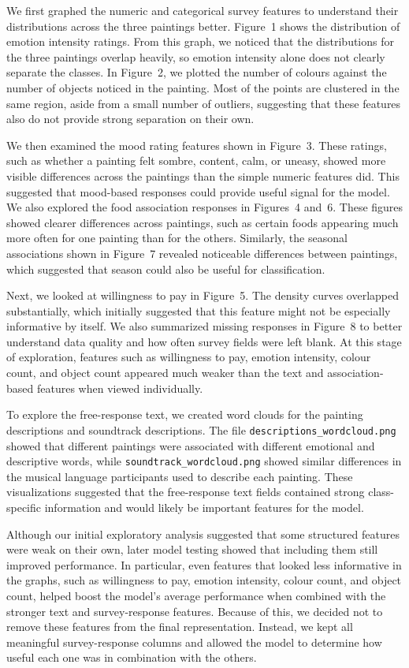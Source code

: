 \documentclass[12pt]{article}
\begin{document}
We first graphed the numeric and categorical survey features to understand their distributions across the three paintings better. Figure~1 shows the distribution of emotion intensity ratings. From this graph, we noticed that the distributions for the three paintings overlap heavily, so emotion intensity alone does not clearly separate the classes. In Figure~2, we plotted the number of colours against the number of objects noticed in the painting. Most of the points are clustered in the same region, aside from a small number of outliers, suggesting that these features also do not provide strong separation on their own.

We then examined the mood rating features shown in Figure~3. These ratings, such as whether a painting felt sombre, content, calm, or uneasy, showed more visible differences across the paintings than the simple numeric features did. This suggested that mood-based responses could provide useful signal for the model. We also explored the food association responses in Figures~4 and~6. These figures showed clearer differences across paintings, such as certain foods appearing much more often for one painting than for the others. Similarly, the seasonal associations shown in Figure~7 revealed noticeable differences between paintings, which suggested that season could also be useful for classification.

Next, we looked at willingness to pay in Figure~5. The density curves overlapped substantially, which initially suggested that this feature might not be especially informative by itself. We also summarized missing responses in Figure~8 to better understand data quality and how often survey fields were left blank. At this stage of exploration, features such as willingness to pay, emotion intensity, colour count, and object count appeared much weaker than the text and association-based features when viewed individually.

To explore the free-response text, we created word clouds for the painting descriptions and soundtrack descriptions. The file \texttt{descriptions\_wordcloud.png} showed that different paintings were associated with different emotional and descriptive words, while \texttt{soundtrack\_wordcloud.png} showed similar differences in the musical language participants used to describe each painting. These visualizations suggested that the free-response text fields contained strong class-specific information and would likely be important features for the model.

Although our initial exploratory analysis suggested that some structured features were weak on their own, later model testing showed that including them still improved performance. In particular, even features that looked less informative in the graphs, such as willingness to pay, emotion intensity, colour count, and object count, helped boost the model's average performance when combined with the stronger text and survey-response features. Because of this, we decided not to remove these features from the final representation. Instead, we kept all meaningful survey-response columns and allowed the model to determine how useful each one was in combination with the others.
\end{document}
